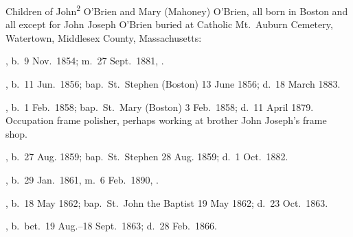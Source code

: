 \begin{KidsIntro}
	Children of John\textsuperscript{2} O'Brien and Mary (Mahoney) O'Brien, all born in Boston and all except for John Joseph O'Brien buried at Catholic Mt.\ Auburn Cemetery, Watertown, Middlesex County, Massachusetts:\cite{BillMcEvoy}
\end{KidsIntro}

\begin{Kids}
	, b.\ 9 Nov.\ 1854; m.\ 27 Sept.\ 1881, .
	
	, b.\ 11 Jun.\ 1856;\cite{Mary3OBrienBirth} bap.\ St.\ Stephen (Boston) 13 June 1856;\cite{Mary3OBrienBaptism} d.\ 18 March 1883.\cite{Mary3OBrienDeath}
	
	, b.\ 1 Feb.\ 1858;\cite{James3OBrienBirth} bap.\ St.\ Mary (Boston) 3 Feb.\ 1858;\cite{James3OBrienBaptism} d.\ 11 April 1879. Occupation frame polisher,\cite{James3OBrienDeath} perhaps working at brother John Joseph's frame shop.
	
	, b.\ 27 Aug. 1859;\cite{Ellen3OBrienBaptism} bap.\ St.\ Stephen 28 Aug. 1859;\cite{Ellen3OBrienBaptism} d.\ 1 Oct.\ 1882.\cite{Ellen3OBrienDeath}
	
	, b.\ 29 Jan.\ 1861, m.\ 6 Feb.\ 1890, .
	
	, b.\ 18 May 1862;\cite{Margaret3OBrienBaptism} bap.\ St.\ John the Baptist 19 May 1862;\cite{Margaret3OBrienBaptism} d.\ 23 Oct.\ 1863.\cite{Margaret3OBrienDeath}
	
	, b.\ bet.\ 19 Aug.--18 Sept.\ 1863;\cite{Anna3OBrienDeath} d.\ 28 Feb.\ 1866.\cite{Anna3OBrienDeath}
	
\end{Kids}